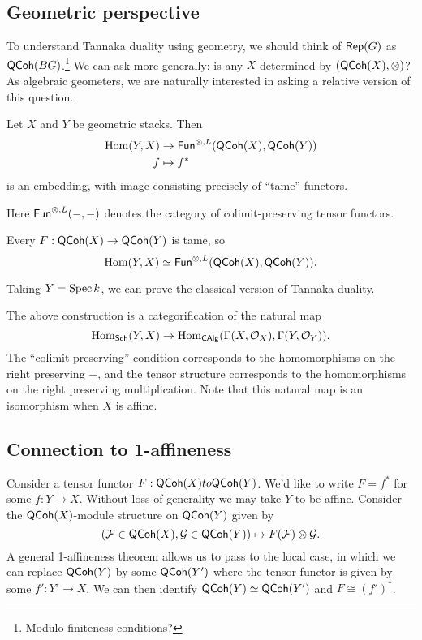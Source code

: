 \documentclass{article}
\begin{document}
\subsection{Geometric perspective}

To understand Tannaka duality using geometry, we should think of $\mathsf{Rep}(G)$ as $\mathsf{QCoh}(BG)$.\footnote{Modulo finiteness conditions?}
We can ask more generally: is any $X$ determined by $(\mathsf{QCoh}(X), \otimes)$?
As algebraic geometers, we are naturally interested in asking a relative version of this question.

\begin{thm}
	Let $X$ and $Y$ be geometric stacks.
	Then
	\begin{align*}
		\operatorname{Hom}(Y, X) &\to \mathsf{Fun}^{\otimes, L}(\mathsf{QCoh}(X), \mathsf{QCoh}(Y)) \\
		f &\mapsto f^*
	\end{align*}
	is an embedding, with image consisting precisely of ``tame'' functors.
\end{thm}

Here $\mathsf{Fun}^{\otimes, L}(-, -)$ denotes the category of colimit-preserving tensor functors.

\begin{thm}
	Every $F: \mathsf{QCoh}(X) \to \mathsf{QCoh}(Y)$ is tame, so
	\[
		\operatorname{Hom}(Y, X) \simeq \mathsf{Fun}^{\otimes, L}(\mathsf{QCoh}(X), \mathsf{QCoh}(Y)).
	\]
\end{thm}

\begin{ex}
	Taking $Y = \operatorname{Spec} k$, we can prove the classical version of Tannaka duality.
\end{ex}

\begin{rmk}
	The above construction is a categorification of the natural map
	\[
		\operatorname{Hom}_{\mathsf{Sch}}(Y, X) \to \operatorname{Hom}_{\mathsf{CAlg}}(\Gamma(X, \mathcal{O}_X), \Gamma(Y, \mathcal{O}_Y)).
	\]
	The ``colimit preserving'' condition corresponds to the homomorphisms on the right preserving $+$, and the tensor structure corresponds to the homomorphisms on the right preserving multiplication.
	Note that this natural map is an isomorphism when $X$ is affine.
\end{rmk}

\subsection{Connection to 1-affineness}

Consider a tensor functor $F: \mathsf{QCoh}(X) to \mathsf{QCoh}(Y)$.
We'd like to write $F = f^*$ for some $f: Y \to X$.
Without loss of generality we may take $Y$ to be affine.
Consider the $\mathsf{QCoh}(X)$-module structure on $\mathsf{QCoh}(Y)$ given by
\[
	(\mathcal{F} \in \mathsf{QCoh}(X), \mathcal{G} \in \mathsf{QCoh}(Y)) \mapsto F(\mathcal{F}) \otimes \mathcal{G}.
\]
A general 1-affineness theorem allows us to pass to the local case, in which we can replace $\mathsf{QCoh}(Y)$ by some $\mathsf{QCoh}(Y')$ where the tensor functor is given by some $f': Y' \to X$.
We can then identify $\mathsf{QCoh}(Y) \simeq \mathsf{QCoh}(Y')$ and $F \cong (f')^*$.
\end{document}
